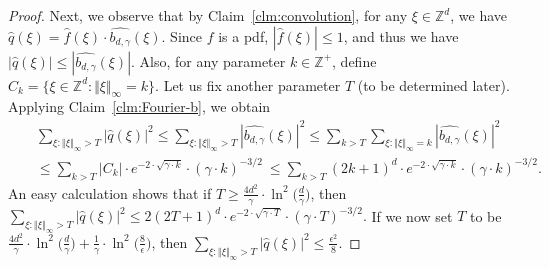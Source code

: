 \begin{proof}
Next, we observe that by Claim~\ref{clm:convolution}, for any $\xi \in
\mathbb{Z}^d$, we have $\widehat{q}(\xi) = \widehat{f}(\xi) \cdot
\widehat{b_{d,\gamma}} (\xi)$. Since $f$ is a pdf, $|\widehat{f}(\xi)
| \le 1$, and thus we have $|\widehat{q}(\xi)| \leq
|\widehat{b_{d,\gamma}} (\xi)|$. Also, for any parameter $k \in
\mathbb{Z}^+$, define $C_k = \{\xi \in \mathbb{Z}^d: \Vert \xi
\Vert_\infty = k\}$.
Let us fix another parameter $T$ (to be determined later). 
Applying Claim~\ref{clm:Fourier-b}, we obtain
\begin{eqnarray}
&& \sum_{\xi: \Vert \xi \Vert_\infty > T} |\widehat{q}(\xi)|^2 \le  \sum_{\xi: \Vert \xi \Vert_\infty > T} |\widehat{b_{d,\gamma}}(\xi)|^2 \le \sum_{k > T} \sum_{\xi: \Vert \xi \Vert_\infty =k}|\widehat{b_{d,\gamma}}(\xi)|^2  \nonumber \\ 
&& \le \sum_{k > T} |C_k| \cdot    e^{-2 \cdot \sqrt{\gamma \cdot k}} \cdot (\gamma \cdot k)^{-3/2} \  
\leq \sum_{k > T} (2k+1)^d \cdot    e^{-2 \cdot \sqrt{\gamma \cdot k}} \cdot (\gamma \cdot k)^{-3/2}. \nonumber
\end{eqnarray}
An easy calculation shows that 
if $T \ge \frac{4d^2}{\gamma} \cdot \ln^2 \bigg(\frac{d}{\gamma}\bigg)$, then $\sum_{\xi: \Vert \xi \Vert_\infty > T} |\widehat{q}(\xi)|^2 \le  2 (2T+1)^d \cdot e^{-2 \cdot \sqrt{\gamma \cdot T}} \cdot  (\gamma \cdot T)^{-3/2}.$
If we now set $T$ to be 
$\frac{4d^2}{\gamma} \cdot \ln^2 \bigg(\frac{d}{\gamma}\bigg) + \frac{1}{\gamma} \cdot \ln^2 \bigg( \frac{8 }{\epsilon}\bigg)$, then $\sum_{\xi: \Vert \xi \Vert_\infty > T} |\widehat{q}(\xi)|^2  \le \frac{\epsilon^2}{8}.$ 


\end{proof}
